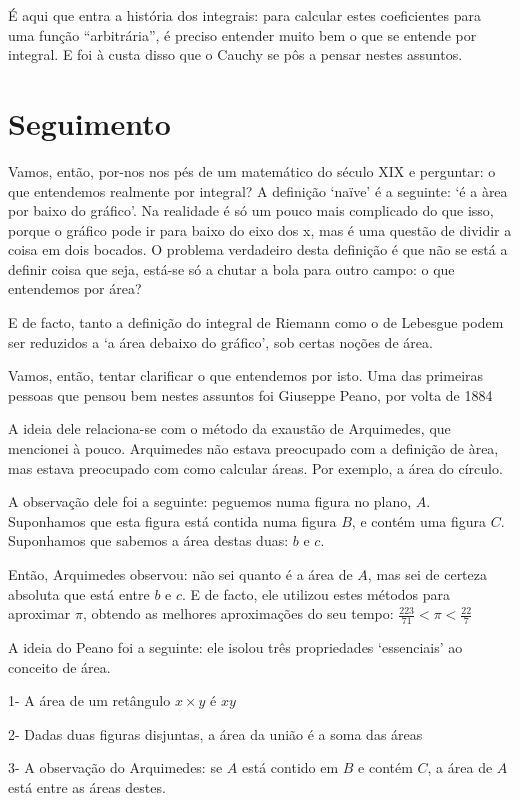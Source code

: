 \documentclass{article}
\begin{document}
É aqui que entra a história dos integrais: para calcular estes coeficientes para uma função ``arbitrária'', é preciso entender muito bem o que se entende por integral. E foi à custa disso que o Cauchy se pôs a pensar nestes assuntos.

\section{Seguimento}

Vamos, então, por-nos nos pés de um matemático do século XIX e perguntar: o que entendemos realmente por integral? A definição `naïve' é a seguinte: `é a àrea por baixo do gráfico'. Na realidade é só um pouco mais complicado do que isso, porque o gráfico pode ir para baixo do eixo dos x, mas é uma questão de dividir a coisa em dois bocados. O problema verdadeiro desta definição é que não se está a definir coisa que seja, está-se só a chutar a bola para outro campo: o que entendemos por área?

E de facto, tanto a definição do integral de Riemann como o de Lebesgue podem ser reduzidos a `a área debaixo do gráfico', sob certas noções de área.

Vamos, então, tentar clarificar o que entendemos por isto. Uma das primeiras pessoas que pensou bem nestes assuntos foi Giuseppe Peano, por volta de 1884

A ideia dele relaciona-se com o método da exaustão de Arquimedes, que mencionei à pouco. Arquimedes não estava preocupado com a definição de àrea, mas estava preocupado com como calcular áreas. Por exemplo, a área do círculo.

A observação dele foi a seguinte: peguemos numa figura no plano, $A$. Suponhamos que esta figura está contida numa figura $B$, e contém uma figura $C$. Suponhamos que sabemos a área destas duas: $b$ e $c$.

Então, Arquimedes observou: não sei quanto é a área de $A$, mas sei de certeza absoluta que está entre $b$ e $c$. E de facto, ele utilizou estes métodos para aproximar $\pi$, obtendo as melhores aproximações do seu tempo: $\frac{223}{71} < \pi < \frac{22}{7}$

A ideia do Peano foi a seguinte: ele isolou três propriedades `essenciais' ao conceito de área.

1- A área de um retângulo $x \times y$ é $xy$

2- Dadas duas figuras disjuntas, a área da união é a soma das áreas

3- A observação do Arquimedes: se $A$ está contido em $B$ e contém $C$, a área de $A$ está entre as áreas destes.
\end{document}
